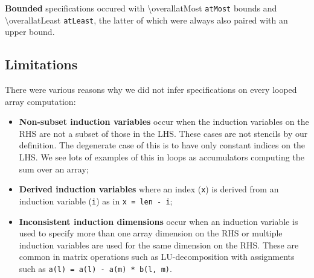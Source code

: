 \textbf{Bounded} specifications occured with \num{\overallatMost}
\texttt{atMost} bounds and \num{\overallatLeast} \texttt{atLeast}, the latter of which were
always also paired with an upper bound.



\subsection{Limitations}

There were various reasons why we did not infer
specifications on every looped array computation:
\begin{itemize}
\item \textbf{Non-subset induction variables} occur when the
induction variables on the RHS are not a subset of those in the LHS. These
cases are not stencils by our definition. The degenerate case of this
is to have only constant indices on the LHS. We see lots of examples
of this in loops as accumulators \eg{} computing the sum over an array;

\item \textbf{Derived induction variables} where an
index (\texttt{x}) is derived from an
induction variable (\texttt{i}) as in
\texttt{x = len - i};

\item \textbf{Inconsistent induction dimensions} occur when
an induction variable is used to specify more than one array dimension
on the RHS or multiple induction variables are used for the same
dimension on the RHS. These are common in matrix operations such as
LU-decomposition with assignments such as
\texttt{a(l) = a(l) - a(m) * b(l, m)}.
\end{itemize}

